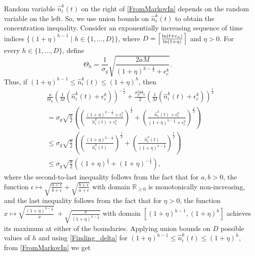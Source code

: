 \documentclass[final,5p,times,twocolumn]{elsarticle}
\theoremstyle{definition}
\def\real{\mathbb{R}}
\newcommand{\until}[1]{\{1,\dots, #1\}}
\newcommand{\setdef}[2]{\{#1 \; | \; #2\}}
\newcommand{\lnn}[1]{%
	\ln  \left(#1\right)%
}
\begin{document}
Random variable $\hat n_i^k(t)$ on the right  of \eqref{FromMarkovIn} %
depends on the random variable on the left. So, we use union bounds on $\hat n_i^k(t)$ to obtain the %
concentration inequality. Consider an exponentially increasing sequence of time indices $\setdef{(1+\eta)^{h-1}}{h \in \until{D}}$, where $D = \left \lceil \frac{\lnn{t+ \epsilon_n}}{\lnn{1 + \eta}} \right \rceil$ and $\eta >0$. 
For every $h \in \{1,\dots,D\}$, define
	\begin{equation}
		\Theta_h = \frac{1}{\sigma_g} \sqrt{\frac{2 a M}{(1+\eta)^{h-\frac{1}{2}} + \epsilon_c^k}}.
	\end{equation}
	Thus, if $(1+\eta)^{h-1} \leq \hat{n}_i^k(t) \leq (1+\eta)^{h}$, then
	\begin{align}
		&\frac{a}{\Theta_h} \left( \frac{1}{M}\left(\hat{n}_i^k(t) + \epsilon_c^k \right)  \right)^{-\frac{1}{2}}  + \frac{ \sigma_g^2 \Theta_h}{2}\left( \frac{1}{M}\left(\hat{n}_i^k(t) + \epsilon_c^k \right)  \right)^{\frac{1}{2}} \nonumber \\
		& = \sigma_g \sqrt{\frac{a}{2}} \left(\! \left( \frac{(1+ \eta)^{h-\frac{1}{2}} + \epsilon_c^k }{\hat{n}_i^k(t) + \epsilon_c^k} \right)^{\frac{1}{2}} \!\! + \left( \frac{\hat{n}_i^k(t) + \epsilon_c^k}{(1+ \eta)^{h-\frac{1}{2}} + \epsilon_c^k } \right)^{\frac{1}{2}}   \! \right) \nonumber \\
		& \le \sigma_g \sqrt{\frac{a}{2}} \left(\! \left( \frac{(1+ \eta)^{h-\frac{1}{2}} }{\hat{n}_i^k(t) } \right)^{\frac{1}{2}} \!\! + \left( \frac{\hat{n}_i^k(t) }{(1+ \eta)^{h-\frac{1}{2}}} \right)^{\frac{1}{2}}   \! \right) \nonumber \\
		&\leq \sigma_g \sqrt{\frac{a}{2}} \left(\! (1+\eta)^{\frac{1}{4}} +  (1+\eta)^{-\frac{1}{4}}   \! \right),
		\label{Finding_delta}
	\end{align}
	where the second-to-last inequality follows from the fact that for $a,b >0$, the function $\epsilon \mapsto \sqrt{\frac{a + \epsilon}{b+\epsilon}} + \sqrt{\frac{b + \epsilon}{a+\epsilon}}$ with domain $\real_{\ge 0}$ is monotonically non-increasing, and
	the last inequality follows from the fact that for $\eta>0$, the function $ x \mapsto \sqrt{\frac{(1+ \eta)^{h-\frac{1}{2}}}{x}} \ + \sqrt{\frac{x}{(1+ \eta)^{h-\frac{1}{2}}}} $ with domain $ [(1+\eta)^{h-1}, (1+\eta)^h]$ achieves its maximum at either of the boundaries. {Applying union bounds on $D$ possible values of $h$ and using \eqref{Finding_delta} for $(1+\eta)^{h-1} \le \hat n_i^k(t) \le (1+\eta)^h$, from \eqref{FromMarkovIn} we get}
\end{document}
